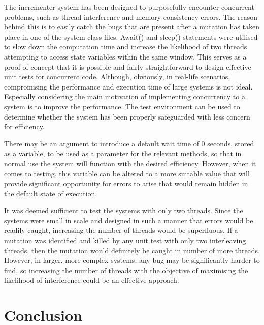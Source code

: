 \documentclass[a4paper,12pt]{article}
\begin{document}
The incrementer system has been designed to purposefully encounter concurrent problems, such as thread interference and memory consistency errors. The reason behind this is to easily catch the bugs that are present after a mutation has taken place in one of the system class files. Await() and sleep() statements were utilised to slow down the computation time and increase the likelihood of two threads attempting to access state variables within the same window. This serves as a proof of concept that it is possible and fairly straightforward to design effective unit tests for concurrent code. Although, obviously, in real-life scenarios, compromising the performance and execution time of large systems is not ideal. Especially considering the main motivation of implementing concurrency to a system is to improve the performance. The test environment can be used to determine whether the system has been properly safeguarded with less concern for efficiency.

There may be an argument to introduce a default wait time of 0 seconds, stored as a variable, to be used as a parameter for the relevant methods, so that in normal use the system will function with the desired efficiency. However, when it comes to testing, this variable can be altered to a more suitable value that will provide significant opportunity for errors to arise that would remain hidden in the default state of execution. 

It was deemed sufficient to test the systems with only two threads. Since the systems were small in scale and designed in such a manner that errors would be readily caught, increasing the number of threads would be superfluous. If a mutation was identified and killed by any unit test with only two interleaving threads, then the mutation would definitely be caught in number of more threads. However, in larger, more complex systems, any bug may be significantly harder to find, so increasing the number of threads with the objective of maximising the likelihood of interference could be an effective approach.

    
    
\newpage	
\section{Conclusion}
\end{document}
